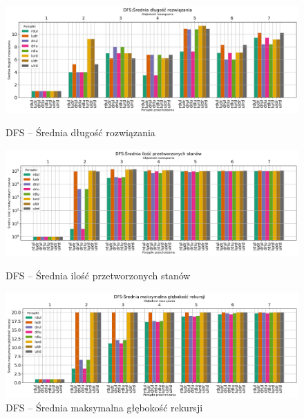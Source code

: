 \documentclass{classrep}
\begin{document}
\begin{figure}[H]
    \includegraphics[width=\textwidth]{charts/DFS_path_length.png}
    \caption{DFS -- Średnia długość rozwiązania}
    \label{DFS:path_length}
    \vspace{0.2cm}
    \includegraphics[width=\textwidth]{charts/DFS_processed.png}
    \caption{DFS -- Średnia ilość przetworzonych stanów}
    \label{DFS:processed}
    \vspace{0.2cm}
    \includegraphics[width=\textwidth]{charts/DFS_recursed.png}
    \caption{DFS --  Średnia maksymalna głębokość rekursji}
    \label{DFS:recursed}

\end{figure}
\end{document}
